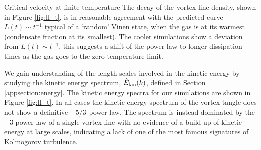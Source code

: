 \begin{chapter}{\label{cha:nonequib}Critical velocity at finite temperature}
The decay of the vortex line density,  shown in Figure \ref{fig:ll_t}, is in reasonable agreement with the predicted curve $L(t) \sim t^{-1}$ typical of a `random' Vinen state, when the gas is at its warmest (condensate fraction at its smallest).
The cooler simulations show a deviation from $L(t) \sim t^{-1}$, this suggests a shift of the power law to longer dissipation times as the gas goes to the zero temperature limit.

We gain understanding of the length scales involved in the kinetic energy by studying the kinetic energy spectrum, $\hat{E}_{\rm kin}(k)$, defined in Section \ref{appsection:energy}. The kinetic energy spectra for our simulations are shown in Figure \ref{fig:ll_t}. In all cases the kinetic energy spectrum of the vortex tangle does not show a definitive $-5/3$ power law. The spectrum is instead dominated by the $-3$ power law of a single vortex line with no evidence of a build up of kinetic energy at large scales, indicating a lack of one of the most famous signatures of Kolmogorov turbulence. 


\end{chapter}
